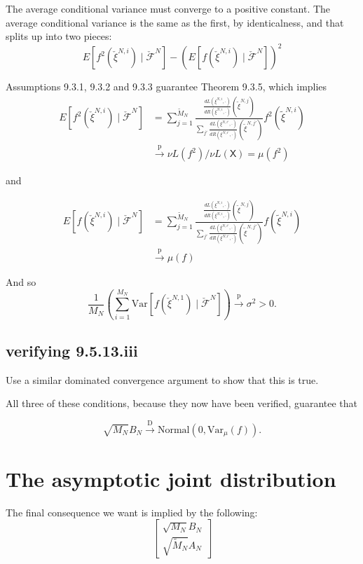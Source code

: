 \documentclass{article}
\begin{document}
The average conditional variance must converge to a positive constant. The average conditional variance is the same as the first, by identicalness, and that splits up into two pieces:
$$
E[f^2(\check{\xi}^{N,i}) \mid \check{\mathcal{F}}^N] - \left( E[f(\check{\xi}^{N,i}) \mid \check{\mathcal{F}}^N] \right)^2
$$

Assumptions 9.3.1, 9.3.2 and 9.3.3 guarantee Theorem 9.3.5, which implies
\begin{align*}
E[f^2(\check{\xi}^{N,i}) \mid \check{\mathcal{F}}^N] 
&= \sum_{j=1}^{\tilde{M}_N} \frac{\frac{dL(\xi^{N,i},\cdot)}{dR(\xi^{N,i},\cdot)}(\tilde{\xi}^{N,j}) }{ \sum_{j'}\frac{dL(\xi^{N,i'},\cdot)}{dR(\xi^{N,i'},\cdot)}(\tilde{\xi}^{N,j'}) }f^2(\tilde{\xi}^{N,i}) \\
&\overset{\text{p}}{\to} \nu L(f^2) / \nu L(\mathsf{X}) = \mu(f^2)
\end{align*}

and

\begin{align*}
E[f(\check{\xi}^{N,i}) \mid \check{\mathcal{F}}^N] 
&= \sum_{j=1}^{\tilde{M}_N} \frac{\frac{dL(\xi^{N,i},\cdot)}{dR(\xi^{N,i},\cdot)}(\tilde{\xi}^{N,j}) }{ \sum_{j'}\frac{dL(\xi^{N,i'},\cdot)}{dR(\xi^{N,i'},\cdot)}(\tilde{\xi}^{N,j'}) }f(\tilde{\xi}^{N,i}) \\
&\overset{\text{p}}{\to}  \mu(f)
\end{align*}

And so 
$$
\frac{1}{M_N} \left( 
\sum_{i=1}^{M_N} \text{Var}\left[ 
f(\check{\xi}^{N,1})
\mid \check{\mathcal{F}}^N
\right]
\right)
\overset{\text{p}}{\to}
\sigma^2 > 0.
$$

\subsection{verifying 9.5.13.iii}

Use a similar dominated convergence argument to show that this is true. 

All three of these conditions, because they now have been verified, guarantee that

$$
\sqrt{M_N}  B_N \overset{\text{D}}{\to} \text{Normal}(0, \text{Var}_{\mu}(f)).
$$


\section{The asymptotic joint distribution}

The final consequence we want is implied by the following:
$$
\begin{bmatrix}
\sqrt{M_N} B_N \\
\sqrt{\tilde{M}_N} A_N
\end{bmatrix}
$$
\end{document}

